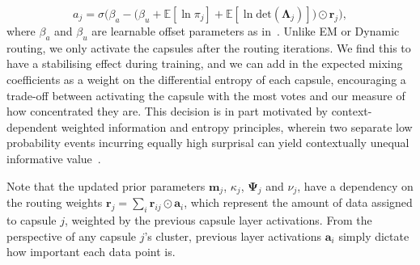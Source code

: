 \documentclass[letterpaper]{article} \usepackage{aaai20}  \usepackage{times}  \usepackage{helvet} \usepackage{courier}  \usepackage[hyphens]{url}  \usepackage{graphicx} \urlstyle{rm} \def\UrlFont{\rm}  \usepackage{graphicx}  \frenchspacing  \setlength{\pdfpagewidth}{8.5in}  \setlength{\pdfpageheight}{11in}  \nocopyright
\begin{document}
\begin{equation}
    a_j = \sigma \Big(\beta_a - \big(\beta_u + \mathbb{E}[\ln \pi_j] + \mathbb{E}[\ln \mathrm{det}(\boldsymbol{\Lambda}_j)]\big) \odot \mathbf{r}_j \Big),  
\end{equation}
where $\beta_a$ and $\beta_u$ are learnable offset parameters as in~\cite{hinton2018matrix}. Unlike EM or Dynamic routing, we only activate the capsules after the routing iterations. We find this to have a stabilising effect during training, and we can add in the expected mixing coefficients as a weight on the differential entropy of each capsule, encouraging a trade-off between activating the capsule with the most votes and our measure of how concentrated they are. This decision is in part motivated by context-dependent weighted information and entropy principles, wherein two separate low probability events incurring equally high surprisal can yield contextually unequal informative value~\cite{guiacsu1971weighted}. 

Note that the updated prior parameters $\mathbf{m}_j$, $\kappa_j$, $\boldsymbol{\Psi}_j$ and $\nu_j$, have a dependency on the routing weights $\mathbf{r}_j = \sum_i \mathbf{r}_{ij} \odot \mathbf{a}_i$, which represent the amount of data assigned to capsule $j$, weighted by the previous capsule layer activations. From the perspective of any capsule $j$'s cluster, previous layer activations $\mathbf{a}_i$ simply dictate how important each data point is. 
\end{document}

